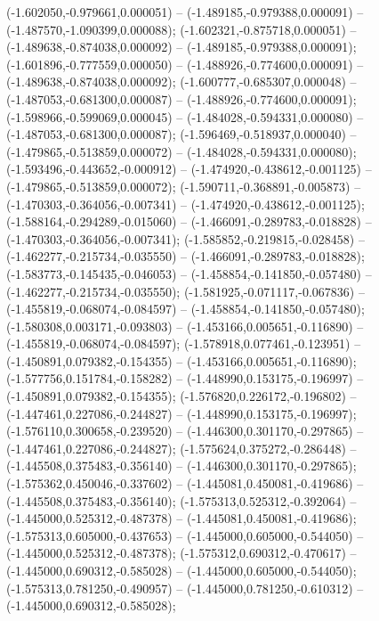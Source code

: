  (-1.602050,-0.979661,0.000051) -- (-1.489185,-0.979388,0.000091) -- (-1.487570,-1.090399,0.000088);
 (-1.602321,-0.875718,0.000051) -- (-1.489638,-0.874038,0.000092) -- (-1.489185,-0.979388,0.000091);
 (-1.601896,-0.777559,0.000050) -- (-1.488926,-0.774600,0.000091) -- (-1.489638,-0.874038,0.000092);
 (-1.600777,-0.685307,0.000048) -- (-1.487053,-0.681300,0.000087) -- (-1.488926,-0.774600,0.000091);
 (-1.598966,-0.599069,0.000045) -- (-1.484028,-0.594331,0.000080) -- (-1.487053,-0.681300,0.000087);
 (-1.596469,-0.518937,0.000040) -- (-1.479865,-0.513859,0.000072) -- (-1.484028,-0.594331,0.000080);
 (-1.593496,-0.443652,-0.000912) -- (-1.474920,-0.438612,-0.001125) -- (-1.479865,-0.513859,0.000072);
 (-1.590711,-0.368891,-0.005873) -- (-1.470303,-0.364056,-0.007341) -- (-1.474920,-0.438612,-0.001125);
 (-1.588164,-0.294289,-0.015060) -- (-1.466091,-0.289783,-0.018828) -- (-1.470303,-0.364056,-0.007341);
 (-1.585852,-0.219815,-0.028458) -- (-1.462277,-0.215734,-0.035550) -- (-1.466091,-0.289783,-0.018828);
 (-1.583773,-0.145435,-0.046053) -- (-1.458854,-0.141850,-0.057480) -- (-1.462277,-0.215734,-0.035550);
 (-1.581925,-0.071117,-0.067836) -- (-1.455819,-0.068074,-0.084597) -- (-1.458854,-0.141850,-0.057480);
 (-1.580308,0.003171,-0.093803) -- (-1.453166,0.005651,-0.116890) -- (-1.455819,-0.068074,-0.084597);
 (-1.578918,0.077461,-0.123951) -- (-1.450891,0.079382,-0.154355) -- (-1.453166,0.005651,-0.116890);
 (-1.577756,0.151784,-0.158282) -- (-1.448990,0.153175,-0.196997) -- (-1.450891,0.079382,-0.154355);
 (-1.576820,0.226172,-0.196802) -- (-1.447461,0.227086,-0.244827) -- (-1.448990,0.153175,-0.196997);
 (-1.576110,0.300658,-0.239520) -- (-1.446300,0.301170,-0.297865) -- (-1.447461,0.227086,-0.244827);
 (-1.575624,0.375272,-0.286448) -- (-1.445508,0.375483,-0.356140) -- (-1.446300,0.301170,-0.297865);
 (-1.575362,0.450046,-0.337602) -- (-1.445081,0.450081,-0.419686) -- (-1.445508,0.375483,-0.356140);
 (-1.575313,0.525312,-0.392064) -- (-1.445000,0.525312,-0.487378) -- (-1.445081,0.450081,-0.419686);
 (-1.575313,0.605000,-0.437653) -- (-1.445000,0.605000,-0.544050) -- (-1.445000,0.525312,-0.487378);
 (-1.575312,0.690312,-0.470617) -- (-1.445000,0.690312,-0.585028) -- (-1.445000,0.605000,-0.544050);
 (-1.575313,0.781250,-0.490957) -- (-1.445000,0.781250,-0.610312) -- (-1.445000,0.690312,-0.585028);
